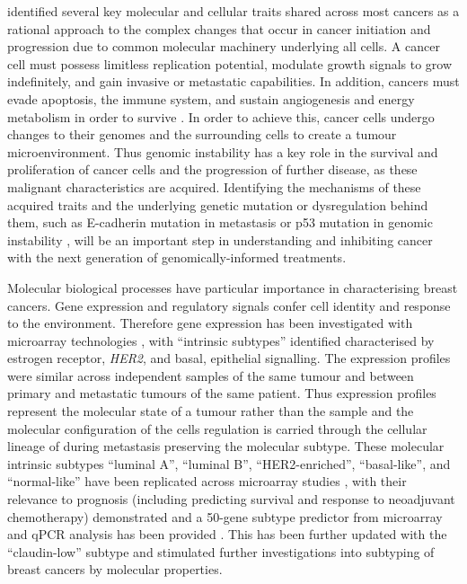 \citet{Hanahan2000} identified several key molecular and cellular traits shared across most cancers as a rational approach to the complex changes that occur in cancer initiation and progression due to common molecular machinery underlying all cells. A cancer cell must possess limitless replication potential, modulate growth signals to grow indefinitely, and gain invasive or metastatic capabilities. In addition, cancers must evade apoptosis, the immune system, and sustain angiogenesis and energy metabolism in order to survive \citep{Hanahan2011, Hanahan2000}. In order to achieve this, cancer cells undergo changes to their genomes and the surrounding cells to create a tumour microenvironment. Thus genomic instability has a key role in the survival and proliferation of cancer cells and the progression of further disease, as these malignant characteristics are acquired. Identifying the mechanisms of these acquired traits and the underlying genetic mutation or dysregulation behind them, such as \gls{E-cadherin} mutation in metastasis or p53 mutation in genomic instability \citep{Hanahan2000}, will be an important step in understanding and inhibiting cancer with the next generation of genomically-informed treatments. 

Molecular biological processes have particular importance in characterising breast cancers. Gene expression and regulatory signals confer cell identity and response to the environment. Therefore gene expression has been investigated with microarray technologies \citet{Perou2000}, with ``intrinsic subtypes'' identified characterised by estrogen receptor, \textit{HER2}, and basal, epithelial signalling. The expression profiles were similar across independent samples of the same tumour and  between primary and metastatic tumours of the same patient. Thus expression profiles represent the molecular state of a tumour rather than the sample and the molecular configuration of the cells regulation is carried through the cellular lineage of during metastasis preserving the molecular subtype. These molecular intrinsic subtypes ``luminal A'', ``luminal B'', ``HER2-enriched'', ``basal-like'', and ``normal-like'' have been replicated across microarray studies \citep{Hu2006}, with their relevance to prognosis (including predicting survival and response to neoadjuvant chemotherapy) demonstrated and a 50-gene subtype predictor from microarray and \gls{qPCR} analysis has been provided \citep{Sorlie2001, Parker2009}. This has been further updated with the ``claudin-low'' subtype \citep{Herschkowitz2007} and stimulated further investigations into subtyping of breast cancers by molecular properties.

